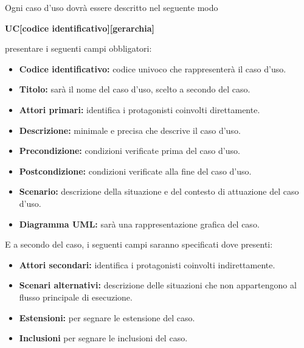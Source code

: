 \documentclass[a4paper,11pt]{article}
\begin{document}
			Ogni caso d'uso dovrà essere descritto nel seguente modo
			\begin{center}
						\textbf{ UC[codice identificativo][gerarchia]}		
					
			\end{center}
			 presentare i seguenti campi obbligatori:
			\begin{itemize}
			\item \textbf{Codice identificativo:} codice univoco che rappresenterà il caso d'uso. 
			\item \textbf{Titolo:} sarà il nome del caso d'uso, scelto a secondo del caso.
			\item \textbf{Attori primari:} identifica i protagonisti coinvolti direttamente.
			\item \textbf{Descrizione:} minimale e precisa che descrive il caso d'uso.
			\item \textbf{Precondizione:} condizioni verificate prima del caso d'uso.
			\item \textbf{Postcondizione:} condizioni verificate alla fine del caso d'uso.
			\item \textbf{Scenario:} descrizione della situazione e del contesto di attuazione del caso d'uso.
			\item \textbf{Diagramma UML\addglos :} sarà una rappresentazione grafica del caso.
			\end{itemize}
			E a secondo del caso, i seguenti campi saranno specificati dove presenti:
			\begin{itemize}
			\item \textbf{Attori secondari:} identifica i protagonisti coinvolti indirettamente.
			\item \textbf{Scenari alternativi:} descrizione delle situazioni che non appartengono al flusso principale di esecuzione.
			\item \textbf{Estensioni:} per segnare le estensione del caso. 
			\item \textbf{Inclusioni}  per segnare le inclusioni del caso.
			\end{itemize}
							
\end{document}

